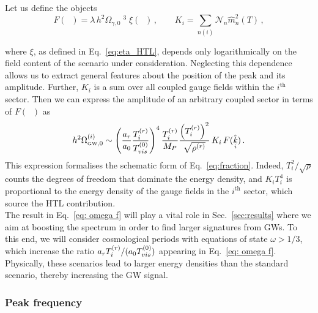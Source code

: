 \documentclass[a4paper,11pt]{article}
\DeclareMathOperator{\hk}{\hat{\mathit{k}}}
\newcommand{\tem}[2]{T_{\tiny{#1}}^{(#2)}}
\begin{document}
Let us define the objects
\begin{equation}
    F(\hk)=\lambda\, h^2\Omega_{\gamma,0}\hk^3\xi(\hk) \, ,\qquad K_i = \sum_{n(i)} \mathcal{N}_n\hat{m}^2_n(T) \,,
\end{equation}

where $\xi$, as defined in Eq.~\eqref{eq:eta_HTL}, depends only logarithmically on the field content of the scenario under consideration. Neglecting this dependence allows us to extract general features about the position of the peak and its amplitude.
Further, $K_{i}$ is a sum over all coupled gauge fields within the $i^{\text{th}}$ sector.
Then we can express the amplitude of an arbitrary coupled sector in terms of $F(\hk)$ as
\begin{equation}\label{eq: omega f}
    h^2\Omega^{(i)}_{\text{\tiny{GW}},0} \sim \left(\frac{a_{r}}{a_0} \frac{\tem{i}{r}}{\tem{vis}{0}}\right)^4 \frac{\tem{i}{r}}{M_{P}} \frac{\left(\tem{i}{r}\right)^2}{\sqrt{\rho^{(r)}}}\,  K_i\, F(\hk_i) \,.
\end{equation}
This expression formalises the schematic form of Eq.~\eqref{eq:fraction}. 
Indeed, $T_i^2/\sqrt{\rho}$ counts the degrees of freedom that dominate the energy density, and $K_iT_i^4$ is proportional to the energy density of the gauge fields in the $i^{\text{th}}$ sector, which source the HTL contribution.\\

The result in Eq.~\eqref{eq: omega f} will play a vital role in Sec.~\ref{sec:results} where we aim at boosting the spectrum in order to find larger signatures from GWs.
To this end,
we will consider cosmological periods with equations of state $\omega>1/3$, which increase the ratio $a_{r}\tem{i}{r}/(a_0\tem{vis}{0})$ appearing in Eq.~\eqref{eq: omega f}. Physically, these scenarios lead to larger energy densities than the standard scenario, thereby increasing the GW signal.

\subsubsection{Peak frequency}
\end{document}
